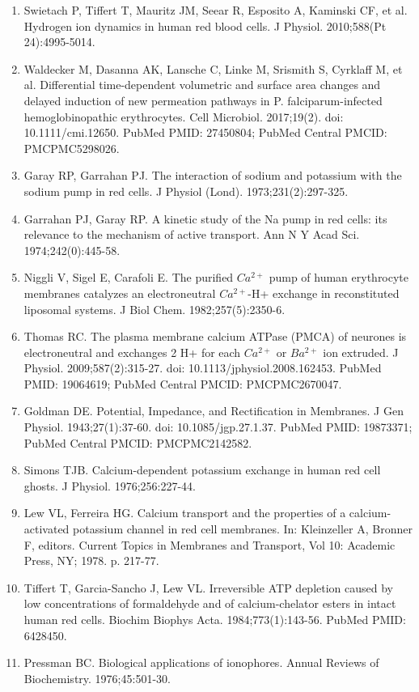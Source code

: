\documentclass[a4paper]{article}
\begin{document}
\begin{enumerate}
\item Swietach P, Tiffert T, Mauritz JM, Seear R, Esposito A, Kaminski CF, et al. Hydrogen ion dynamics in human red blood cells. J Physiol. 2010;588(Pt 24):4995-5014.
\item Waldecker M, Dasanna AK, Lansche C, Linke M, Srismith S, Cyrklaff M, et al. Differential time-dependent volumetric and surface area changes and delayed induction of new permeation pathways in P. falciparum-infected hemoglobinopathic erythrocytes. Cell Microbiol. 2017;19(2). doi: 10.1111/cmi.12650. PubMed PMID: 27450804; PubMed Central PMCID: PMCPMC5298026.
\item Garay RP, Garrahan PJ. The interaction of sodium and potassium with the sodium pump in red cells. J Physiol (Lond). 1973;231(2):297-325.
\item Garrahan PJ, Garay RP. A kinetic study of the Na pump in red cells: its relevance to the mechanism of active transport. Ann N Y Acad Sci. 1974;242(0):445-58.
\item Niggli V, Sigel E, Carafoli E. The purified $Ca^{2+}$ pump of human erythrocyte membranes catalyzes an electroneutral $Ca^{2+}$-H+ exchange in reconstituted liposomal systems. J Biol Chem. 1982;257(5):2350-6.
\item Thomas RC. The plasma membrane calcium ATPase (PMCA) of neurones is electroneutral and exchanges 2 H+ for each $Ca^{2+}$ or $Ba^{2+}$ ion extruded. J Physiol. 2009;587(2):315-27. doi: 10.1113/jphysiol.2008.162453. PubMed PMID: 19064619; PubMed Central PMCID: PMCPMC2670047.
\item Goldman DE. Potential, Impedance, and Rectification in Membranes. J Gen Physiol. 1943;27(1):37-60. doi: 10.1085/jgp.27.1.37. PubMed PMID: 19873371; PubMed Central PMCID: PMCPMC2142582.
\item Simons TJB. Calcium-dependent potassium exchange in human red cell ghosts. J Physiol. 1976;256:227-44.
\item Lew VL, Ferreira HG. Calcium transport and the properties of a calcium-activated potassium channel in red cell membranes. In: Kleinzeller A, Bronner F, editors. Current Topics in Membranes and Transport, Vol 10: Academic Press, NY; 1978. p. 217-77.
\item Tiffert T, Garcia-Sancho J, Lew VL. Irreversible ATP depletion caused by low concentrations of formaldehyde and of calcium-chelator esters in intact human red cells. Biochim Biophys Acta. 1984;773(1):143-56. PubMed PMID: 6428450.
\item Pressman BC. Biological applications of ionophores. Annual Reviews of Biochemistry. 1976;45:501-30.

\end{enumerate}
\end{document}
